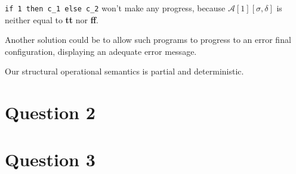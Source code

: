 \documentclass{article}
\newcommand{\Aa}[2]{\mathcal{A}\left[#1\right]\left[#2\right]}
\begin{document}
\texttt{if 1 then c\_1 else c\_2} won't make any progress, because $\Aa{1}{\sigma,\delta}$ is neither equal to \textbf{tt} nor \textbf{ff}.

Another solution could be to allow such programs to progress to an error final configuration, displaying an adequate error message.

Our structural operational semantics is partial and deterministic.

\section*{Question 2}
	
\section*{Question 3}
\end{document}
